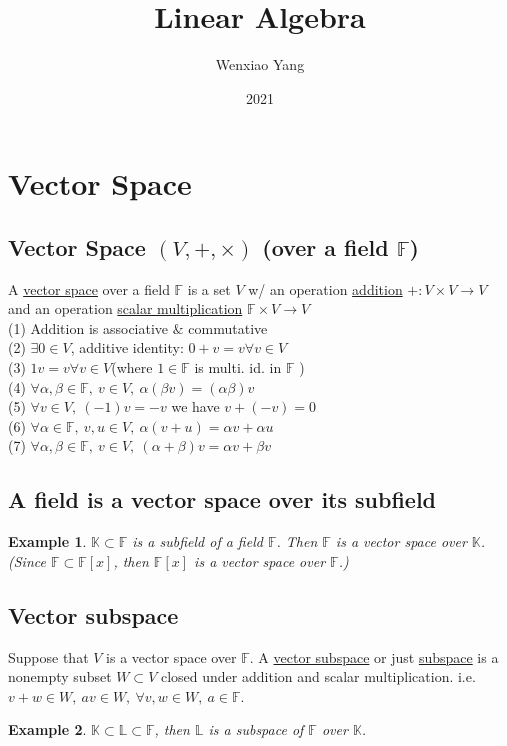 \documentclass[11pt,a4paper]{article}
\title{Linear Algebra}
\author[*]{Wenxiao Yang}
\affil[*]{Department of Mathematics, University of Illinois at Urbana-Champaign}
\date{2021}
\newtheorem{example}{Example}
\begin{document}
\maketitle
\tableofcontents
\newpage

\section{Vector Space}
\subsection{Vector Space $(V,+,\times)$ (over a field $\mathbb{F}$)}
A \underline{vector space} over a field $\mathbb{F}$ is a
set $V$ w/ an operation \underline{addition} $+ : V \times V \rightarrow V$ and
an operation \underline{scalar multiplication} $\mathbb{F} \times V \rightarrow V$\\
(1) Addition is associative $\&$ commutative\\
(2) $\exists 0\in V$, additive identity: $0 + v = v \forall v \in V$\\
(3) $1v = v \forall v \in V$(where $1 \in \mathbb{F}$ is multi. id. in $\mathbb{F}$ )\\
(4) $\forall \alpha,\beta\in\mathbb{F},\ v\in V,\ \alpha(\beta v)=(\alpha\beta)v$\\
(5) $\forall v\in V,\ (-1)v=-v$ we have $v+(-v)=0$\\
(6) $\forall \alpha\in\mathbb{F},\ v,u\in V,\ \alpha(v+u)=\alpha v+\alpha u$\\
(7) $\forall \alpha,\beta\in\mathbb{F},\ v\in V,\ (\alpha+\beta)v=\alpha v+\beta v$

\subsection{A field is a vector space over its subfield}
\begin{example}
$\mathbb{K}\subset\mathbb{F}$ is a subfield of a field $\mathbb{F}$. Then $\mathbb{F}$ is a vector space over $\mathbb{K}$. (Since $\mathbb{F}\subset \mathbb{F}[x]$, then $\mathbb{F}[x]$ is a vector space over $\mathbb{F}$.)
\end{example}
\subsection{ Vector subspace}
Suppose that $V$ is a vector space over $\mathbb{F}$. A \underline{vector subspace} or just \underline{subspace} is a nonempty subset $W\subset V$ closed under addition and scalar multiplication. i.e. $v+w\in W,\ av\in W,\ \forall v,w\in W,\ a\in \mathbb{F}$.\\
\begin{example}
$\mathbb{K}\subset \mathbb{L}\subset \mathbb{F}$, then $\mathbb{L}$ is a subspace of $\mathbb{F}$ over $\mathbb{K}$.
\end{example}
\end{document}
